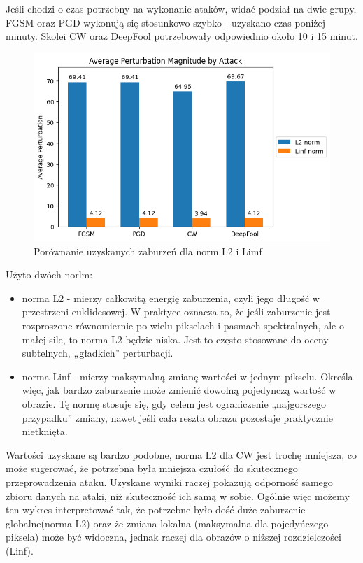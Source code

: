 \documentclass{article}
\begin{document}
Jeśli chodzi o czas potrzebny na wykonanie ataków, widać podział na dwie grupy, FGSM oraz PGD wykonują się stosunkowo szybko - uzyskano czas poniżej minuty. Skolei CW oraz DeepFool potrzebowały odpowiednio około 10 i 15 minut.

\begin{figure}[H]
    \centering
    \includegraphics[width=1\textwidth]{perturbations.png} 
    \caption{Porównanie uzyskanych zaburzeń dla norm L2 i Limf}
\end{figure}

Użyto dwóch norlm:
\begin{itemize}
    \item norma L2 - mierzy całkowitą energię zaburzenia, czyli jego długość w przestrzeni euklidesowej. W praktyce oznacza to, że jeśli zaburzenie jest rozproszone równomiernie po wielu pikselach i pasmach spektralnych, ale o małej sile, to norma L2 będzie niska. Jest to często stosowane do oceny subtelnych, „gładkich” perturbacji.
    \item norma Linf - mierzy maksymalną zmianę wartości w jednym pikselu. Określa więc, jak bardzo zaburzenie może zmienić dowolną pojedynczą wartość w obrazie. Tę normę stosuje się, gdy celem jest ograniczenie „najgorszego przypadku” zmiany, nawet jeśli cała reszta obrazu pozostaje praktycznie nietknięta.
\end{itemize}
Wartości uzyskane są bardzo podobne, norma L2 dla CW jest trochę mniejsza, co może sugerować, że potrzebna była mniejsza czułość do skutecznego przeprowadzenia ataku. Uzyskane wyniki raczej pokazują odporność samego zbioru danych na ataki, niż skuteczność ich samą w sobie. Ogólnie więc możemy ten wykres interpretować tak, że potrzebne było dość duże zaburzenie globalne(norma L2) oraz że zmiana lokalna (maksymalna dla pojedyńczego piksela) może być widoczna, jednak raczej dla obrazów o niższej rozdzielczości (Linf).
\end{document}
